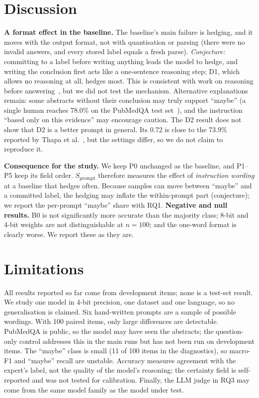 \documentclass[conference]{IEEEtran}
\newcommand{\Sp}{S_{\mathrm{prompt}}}
\begin{document}
\section{Discussion}
\textbf{A format effect in the baseline.} The baseline's main failure is
hedging, and it moves with the output format, not with quantisation or
parsing (there were no invalid answers, and every stored label equals a
fresh parse). \emph{Conjecture:} committing to a label before writing
anything leads the model to hedge, and writing the conclusion first acts
like a one-sentence reasoning step; D1, which allows no reasoning at all,
hedges most. This is consistent with work on reasoning before
answering~\cite{wei2022chain}, but we did not test the mechanism.
Alternative explanations remain: some abstracts without their conclusion
may truly support ``maybe'' (a single human reaches 78.0\% on the PubMedQA
test set~\cite{jin2019pubmedqa}), and the instruction ``based only on this
evidence'' may encourage caution. The D2 result does not show that D2 is a
better prompt in general. Its 0.72 is close to the 73.9\% reported by Thapa
et al.~\cite{thapa2025disentangling}, but the settings differ, so we do
not claim to reproduce it.

\textbf{Consequence for the study.} We keep P0 unchanged as the baseline,
and P1--P5 keep its field order. $\Sp$ therefore measures the effect of
\emph{instruction wording} at a baseline that hedges often. Because
samples can move between ``maybe'' and a committed label, the hedging may
inflate the within-prompt part (conjecture); we report the per-prompt
``maybe'' share with RQ1.
\textbf{Negative and null results.} B0 is not significantly more accurate
than the majority class; 8-bit and 4-bit weights are not distinguishable
at $n = 100$; and the one-word format is clearly worse. We report these as
they are.

\section{Limitations}
All results reported so far come from development items; none is a
test-set result. We study one model in 4-bit precision, one dataset and
one language, so no generalisation is claimed. Six hand-written prompts
are a sample of possible wordings. With 100 paired items, only large
differences are detectable. PubMedQA is public, so the model may have seen
the abstracts; the question-only control addresses this in the main runs
but has not been run on development items. The ``maybe'' class is small
(11 of 100 items in the diagnostics), so macro-F1 and ``maybe'' recall
are unstable. Accuracy measures agreement with the expert's label, not the
quality of the model's reasoning; the certainty field is self-reported
and was not tested for calibration. Finally, the LLM judge in RQ3 may come
from the same model family as the model under test.
\end{document}
